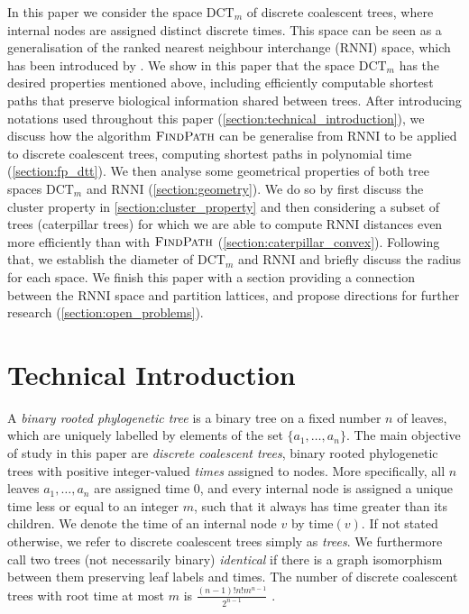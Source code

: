 \documentclass[11pt]{amsart}
\newcommand{\rnni}{\mathrm{RNNI}}
\newcommand{\findpath}{\textsc{FindPath}}
\newcommand{\ntime}{\mathrm{time}}
\newcommand{\dtt}{\mathrm{DCT}}
\newcommand{\summary}[1]{} %
\begin{document}
\summary{Structure of the paper.}
In this paper we consider the space $\dtt_m$ of discrete coalescent trees, where internal nodes are assigned distinct discrete times.
This space can be seen as a generalisation of the ranked nearest neighbour interchange ($\rnni$) space, which has been introduced by \textcite{Collienne2020-iu}.
We show in this paper that the space $\dtt_m$ has the desired properties mentioned above, including efficiently computable shortest paths that preserve biological information shared between trees.
After introducing notations used throughout this paper (\autoref{section:technical_introduction}), we discuss how the algorithm $\findpath$ \autocite{Collienne2020-iu} can be generalise from $\rnni$ to be applied to discrete coalescent trees, computing shortest paths in polynomial time (\autoref{section:fp_dtt}).
We then analyse some geometrical properties of both tree spaces $\dtt_m$ and $\rnni$ (\autoref{section:geometry}).
We do so by first discuss the cluster property in \autoref{section:cluster_property} and then considering a subset of trees (caterpillar trees) for which we are able to compute $\rnni$ distances even more efficiently than with $\findpath$ (\autoref{section:caterpillar_convex}).
Following that, we establish the diameter of $\dtt_m$ and $\rnni$ and briefly discuss the radius for each space.
We finish this paper with a section providing a connection between the $\rnni$ space and partition lattices, and propose directions for further research (\autoref{section:open_problems}).


\section{Technical Introduction}
\label{section:technical_introduction}

\summary{Introducing discrete coalescent trees and ranked trees}
A \emph{binary rooted phylogenetic tree} is a binary tree on a fixed number $n$ of leaves, which are uniquely labelled by elements of the set $\{a_1, \ldots, a_n\}$.
The main objective of study in this paper are \emph{discrete coalescent trees}, binary rooted phylogenetic trees with positive integer-valued \emph{times} assigned to nodes.
More specifically, all $n$ leaves $a_1, \ldots, a_n$ are assigned time $0$, and every internal node is assigned a unique time less or equal to an integer $m$, such that it always has time greater than its children.
We denote the time of an internal node $v$ by $\ntime(v)$.
If not stated otherwise, we refer to discrete coalescent trees simply as \emph{trees}.
We furthermore call two trees (not necessarily binary) \emph{identical} if there is a graph isomorphism between them preserving leaf labels and times.
The number of discrete coalescent trees with root time at most $m$ is $\frac{(n-1)!n!m^{n-1}}{2^{n-1}}$ \autocite{Gavryushkin2018-ol}.
\end{document}
